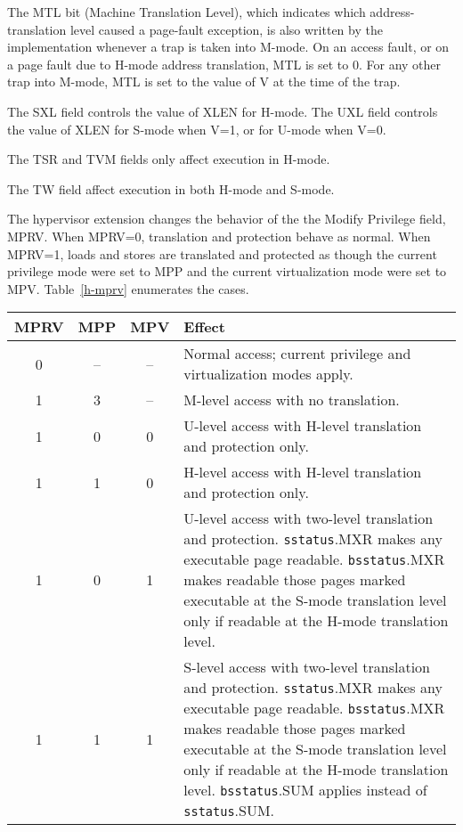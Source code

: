 The MTL bit (Machine Translation Level), which indicates which address-translation level
caused a page-fault exception, is also written by the implementation whenever a trap
is taken into M-mode.  On an access fault, or on a page fault due to H-mode address
translation, MTL is set to 0.  For any other trap into M-mode, MTL is set to the value
of V at the time of the trap.

The SXL field controls the value of XLEN for H-mode.
The UXL field controls the value of XLEN for S-mode when V=1, or for U-mode when V=0.

The TSR and TVM fields only affect execution in H-mode.

The TW field affect execution in both H-mode and S-mode.

The hypervisor extension changes the behavior of the the Modify Privilege
field, MPRV.  When MPRV=0, translation and protection behave as normal.  When
MPRV=1, loads and stores are translated and protected as though the current
privilege mode were set to MPP and the current virtualization mode were set to
MPV.  Table~\ref{h-mprv} enumerates the cases.

\begin{table*}[h!]
\begin{center}
\begin{tabular}{|c|c|c||p{5in}|}
  \hline
   MPRV & MPP & MPV & Effect \\ \hline \hline
   0    & --  & -- & Normal access; current privilege and virtualization modes apply. \\ \hline
   1    & 3   & -- & M-level access with no translation. \\ \hline
   1    & 0   & 0  & U-level access with H-level translation and protection only. \\ \hline
   1    & 1   & 0  & H-level access with H-level translation and protection only.  \\ \hline
   1    & 0   & 1  & U-level access with two-level translation and protection. {\tt sstatus}.MXR makes any executable page readable.  {\tt bsstatus}.MXR makes readable those pages marked executable at the S-mode translation level only if readable at the H-mode translation level. \\ \hline
   1    & 1   & 1  & S-level access with two-level translation and protection. {\tt sstatus}.MXR makes any executable page readable.  {\tt bsstatus}.MXR makes readable those pages marked executable at the S-mode translation level only if readable at the H-mode translation level. {\tt bsstatus}.SUM applies instead of {\tt sstatus}.SUM. \\ \hline
 \end{tabular}
\end{center}
\caption{Effect on load and store translation and protection under MPRV.  When MPRV=1, MPP$\neq$M, and {\tt hstatus}.SPRV=1, the effective privilege is furhter modified: {\tt sstatus}.SPP applies instead of MPP, and {\tt hstatus}.SPV applies instead of MPV.}
\label{h-mprv}
\end{table*}

